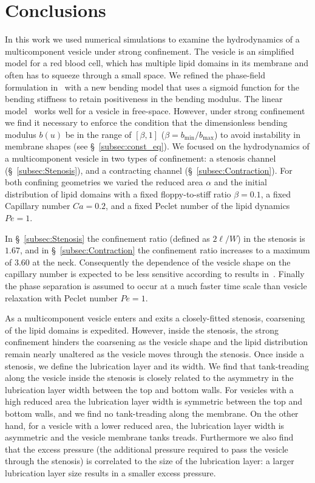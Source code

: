 \documentclass[twoside,twocolumn,9pt]{article}
\begin{document}
\section{Conclusions \label{sec:conclusion}}
In this work we used numerical simulations to examine the hydrodynamics
of a multicomponent vesicle under strong confinement. The vesicle is an
simplified model for a red blood cell, which has multiple lipid domains
in its membrane and often has to squeeze through a small space.  We
refined the phase-field formulation in~\citet{liu-mar-li-vee-low2017}
with a new bending model that uses a sigmoid function for the bending
stiffness to retain positiveness in the bending modulus. The linear
model~\cite{liu-mar-li-vee-low2017} works well for a vesicle in
free-space. However, under strong confinement we find it necessary to
enforce the condition that the dimensionless bending modulus $b(u)$ be
in the range of $[\beta,1]$ ($\beta = b_{\min}/b_{\max}$) to avoid
instability in membrane shapes (see \S~\ref{subsec:const_eq}). We
focused on the hydrodynamics of a multicomponent vesicle in two types of
confinement: a stenosis channel (\S~\ref{subsec:Stenosis}), and a
contracting channel (\S~\ref{subsec:Contraction}). For both confining
geometries we varied the reduced area $\alpha$ and the initial
distribution of lipid domains with a fixed floppy-to-stiff ratio
$\beta=0.1$, a fixed Capillary number $Ca = 0.2$, and a fixed Peclet
number of the lipid dynamics $Pe=1$. 

In \S~\ref{subsec:Stenosis} the confinement ratio (defined as $2\ell/W$)
in the stenosis is $1.67$, and in \S~\ref{subsec:Contraction} the
confinement ratio increases to a maximum of $3.60$ at the neck.
Consequently the dependence of the vesicle shape on the capillary number
is expected to be less sensitive according to results
in~\citet{aga-bir2020}. Finally the phase separation is assumed to occur
at a much faster time scale than vesicle relaxation with Peclet number
$Pe=1$.

As a multicomponent vesicle enters and exits a closely-fitted stenosis,
coarsening of the lipid domains is expedited. However, inside the
stenosis, the strong confinement hinders the coarsening as the vesicle
shape and the lipid distribution remain nearly unaltered as the
vesicle moves through the stenosis. Once inside a stenosis, we define
the lubrication layer and its width. We find that tank-treading along
the vesicle inside the stenosis is closely related to the asymmetry in
the lubrication layer width between the top and bottom walls. For
vesicles with a high reduced area the lubrication layer width is
symmetric between the top and bottom walls, and we find no tank-treading
along the membrane. On the other hand, for a vesicle with a lower
reduced area, the lubrication layer width is asymmetric and the vesicle
membrane tanks treads. Furthermore we also find that the excess pressure
(the additional pressure required to pass the vesicle through the
stenosis) is correlated to the size of the lubrication layer: a larger
lubrication layer size results in a smaller excess pressure.
\end{document}
